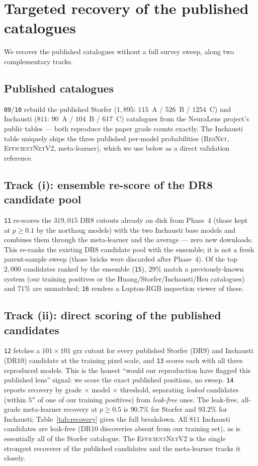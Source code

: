 \documentclass[11pt,letterpaper]{article}
\newcommand{\ResNet}{\textsc{ResNet}}
\newcommand{\EffNet}{\textsc{EfficientNetV2}}
\newcommand{\rStorferHonest}{90.7\%}
\newcommand{\rInchaustiHonest}{93.2\%}
\begin{document}
\section{Targeted recovery of the published catalogues}
\label{sec:recovery}

We recover the published catalogues without a full survey sweep, along two
complementary tracks.

\subsection{Published catalogues}

\texttt{09}/\texttt{10} rebuild the published Storfer ($1{,}895$: $115$~A /
$526$~B / $1254$~C) and Inchausti ($811$: $90$~A / $104$~B / $617$~C) catalogues
from the NeuraLens project's public tables --- both reproduce the paper grade
counts exactly. The Inchausti table uniquely ships the three published per-model
probabilities (\ResNet{}, \EffNet{}, meta-learner), which we use below as a
direct validation reference.

\subsection{Track (i): ensemble re-score of the DR8 candidate pool}

\texttt{11} re-scores the $319{,}015$ DR8 cutouts already on disk from Phase~4
(those kept at $p\ge0.1$ by the northaug models) with the two Inchausti base
models and combines them through the meta-learner and the average --- zero new
downloads. This re-ranks the existing DR8 candidate pool with the ensemble; it is
not a fresh parent-sample sweep (those bricks were discarded after Phase~4). Of
the top $2{,}000$ candidates ranked by the ensemble (\texttt{15}), $29\%$ match a
previously-known system (our training positives or the Huang/Storfer/Inchausti/Hsu
catalogues) and $71\%$ are unmatched; \texttt{16} renders a Lupton-RGB inspection
viewer of these.

\subsection{Track (ii): direct scoring of the published candidates}

\texttt{12} fetches a $101\times101$ grz cutout for every published Storfer (DR9)
and Inchausti (DR10) candidate at the training pixel scale, and \texttt{13}
scores each with all three reproduced models. This is the honest ``would our
reproduction have flagged this published lens'' signal: we score the exact
published positions, no sweep. \texttt{14} reports recovery by grade $\times$
model $\times$ threshold, separating \emph{leaked} candidates (within $5''$ of one
of our training positives) from \emph{leak-free} ones. The leak-free, all-grade
meta-learner recovery at $p\ge0.5$ is $\rStorferHonest{}$ for Storfer and
$\rInchaustiHonest{}$ for Inchausti; Table~\ref{tab:recovery} gives the full
breakdown. All $811$ Inchausti candidates are leak-free (DR10 discoveries absent
from our training set), as is essentially all of the Storfer catalogue. The
\EffNet{} is the single strongest recoverer of the published candidates and the
meta-learner tracks it closely.
\end{document}
